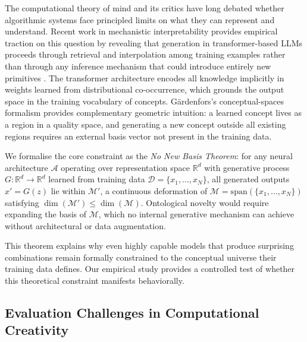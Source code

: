 \documentclass[pdflatex,sn-mathphys-num]{sn-jnl}
\begin{document}
The computational theory of mind \cite{turing1936computable,godel1931formal} and its critics
\cite{searle1980minds,penrose1990emperors,dreyfus1972computers} have long debated whether
algorithmic systems face principled limits on what they can represent and understand.  Recent
work in mechanistic interpretability provides empirical traction on this question by revealing
that generation in transformer-based LLMs proceeds through retrieval and interpolation among
training examples rather than through any inference mechanism that could introduce entirely new
primitives \cite{brown2020language,elhage2021mathematical}.  The transformer architecture
\cite{vaswani2017attention} encodes all knowledge implicitly in weights learned from
distributional co-occurrence, which grounds the output space in the training vocabulary of
concepts.  G{\"a}rdenfors's conceptual-spaces formalism \cite{gardenfors2000conceptual}
provides complementary geometric intuition: a learned concept lives as a region in a quality
space, and generating a new concept outside all existing regions requires an external
basis vector not present in the training data.

We formalise the core constraint as the \emph{No New Basis Theorem}: for any neural
architecture $\mathcal{A}$ operating over representation space $\mathbb{R}^{d}$ with
generative process $G\colon \mathbb{R}^{d} \to \mathbb{R}^{d}$ learned from training data
$\mathcal{D} = \{x_1,\ldots,x_N\}$, all generated outputs $x' = G(z)$ lie within $\mathcal{M}'$,
a continuous deformation of $\mathcal{M} = \mathrm{span}(\{x_1,\ldots,x_N\})$ satisfying
$\dim(\mathcal{M}') \leq \dim(\mathcal{M})$.  Ontological novelty would require expanding the
basis of $\mathcal{M}$, which no internal generative mechanism can achieve without
architectural or data augmentation.

This theorem explains why even highly capable models that produce surprising combinations
remain formally constrained to the conceptual universe their training data defines.  Our
empirical study provides a controlled test of whether this theoretical constraint manifests
behaviorally.

\subsection{Evaluation Challenges in Computational Creativity}
\end{document}
